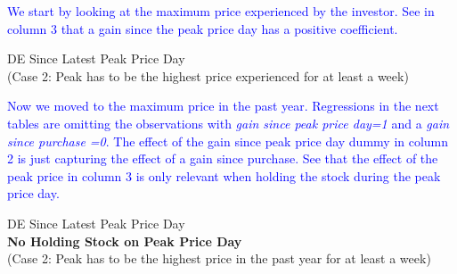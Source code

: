 \clearpage
\textcolor{blue}{We start by looking at the maximum price experienced by the investor. See in column 3 that a gain since the peak price day has a positive coefficient. }

\begin{econtable}[h]\footnotesize
	\caption{DE Since Latest Peak Price Day \\ (Case 2: Peak has to be the highest price experienced for at least a week) }
	\label{tab:}
\end{econtable}



\clearpage
\textcolor{blue}{Now we moved to the maximum price in the past year. Regressions in the next tables are omitting the observations with \textit{gain since peak price day=1} and a \textit{gain since purchase =0}. The effect of the gain since peak price day dummy in column 2 is just capturing the effect of a gain since purchase. See that the effect of the peak price in column 3 is only relevant when holding the stock during the peak price day.   }

\begin{econtable}[h]\footnotesize
	\caption{DE Since Latest Peak Price Day \\\textbf{ No Holding Stock on Peak Price Day} \\ (Case 2: Peak has to be the highest price in the past year for at least a week) }
	\label{tab:}
\end{econtable}





